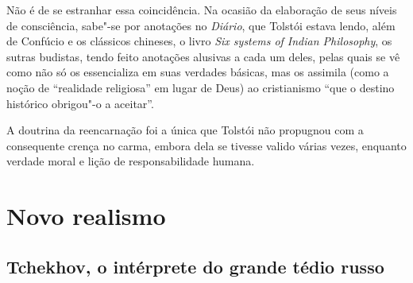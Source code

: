 Não é de se estranhar essa coincidência. Na ocasião da elaboração de seus
níveis de consciência, sabe"-se por anotações no \emph{Diário}, que Tolstói estava lendo, além de Confúcio e os
clássicos chineses, o livro \emph{Six systems of Indian
Philosophy}, os sutras budistas, tendo feito anotações alusivas
a cada um deles, pelas quais se vê como não só os essencializa em suas
verdades básicas, mas os assimila (como a noção de ``realidade
religiosa'' em lugar de Deus) ao cristianismo ``que o destino histórico
obrigou"-o a aceitar''.

A doutrina da reencarnação foi a única que Tolstói não propugnou com a
consequente crença no carma, embora dela se tivesse valido
várias vezes, enquanto verdade moral e lição de responsabilidade humana.


\part{Novo realismo}

\chapter{Tchekhov, o intérprete do grande tédio russo}


